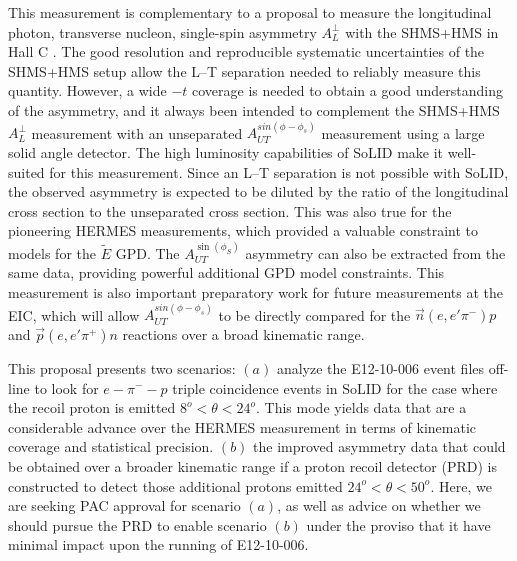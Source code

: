 \documentclass{article}
\begin{document}
This measurement is complementary to a proposal to measure the longitudinal
photon, transverse nucleon, single-spin asymmetry $A_L^{\perp}$ with the
SHMS+HMS in Hall C \cite{atpi39}.  The good resolution and reproducible
systematic uncertainties of the SHMS+HMS setup allow the L--T separation needed
to reliably measure this quantity.  However, a wide $-t$ coverage is needed to
obtain a good understanding of the asymmetry, and it always been intended to
complement the SHMS+HMS $A_L^{\perp}$ measurement with an unseparated
$A_{UT}^{sin(\phi-\phi_s)}$ measurement using a large solid angle detector.
The high luminosity capabilities of SoLID make it well-suited for this
measurement.  Since an L--T separation is not possible with SoLID, the observed
asymmetry is expected to be diluted by the ratio of the longitudinal cross
section to the unseparated cross section.  This was also true for the
pioneering HERMES measurements, which provided a valuable constraint to models
for the $\tilde{E}$ GPD.  The $A_{UT}^{\sin(\phi_S)}$ asymmetry can also be
extracted from the same data, providing powerful additional GPD model
constraints.  This measurement is also important preparatory work for future
measurements at the EIC, which will allow $A_{UT}^{sin(\phi-\phi_s)}$ to be
directly compared for the $\vec{n}(e,e'\pi^-)p$ and $\vec{p}(e,e'\pi^+)n$
reactions over a broad kinematic range.

This proposal presents two scenarios: $(a)$ analyze the E12-10-006 event files
off-line to look for $e-\pi^--p$ triple coincidence events in SoLID for the
case where the recoil proton is emitted $8^o<\theta<24^o$.  This mode yields
data that are a considerable advance over the HERMES measurement in terms of
kinematic coverage and statistical precision.  $(b)$ the improved asymmetry
data that could be obtained over a broader kinematic range if a proton recoil
detector (PRD) is constructed to detect those additional protons emitted
$24^o<\theta<50^o$.  Here, we are seeking PAC approval for scenario $(a)$, as
well as advice on whether we should pursue the PRD to enable scenario $(b)$
under the proviso that it have minimal impact upon the running of E12-10-006.

\newpage
\appendix



\end{document}

